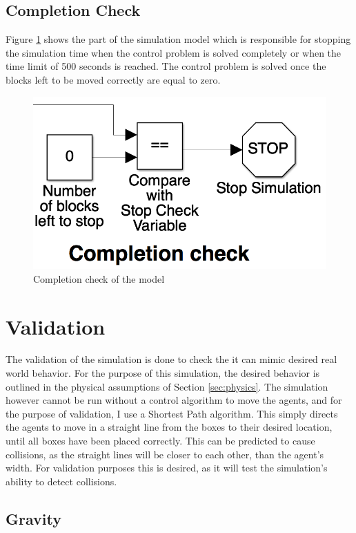 \subsection{Completion Check}
Figure \ref{fig:completion_check} shows the part of the simulation model which is responsible for stopping the simulation time when the control problem is solved completely or when the time limit of 500 seconds is reached. The control problem is solved once the blocks left to be moved correctly are equal to zero. 

\begin{figure}[H]
  \centering
  \includegraphics[width=.6\columnwidth]{figures/completion_check}
  \caption{\label{fig:completion_check}Completion check of the model}
\end{figure}

\section{Validation}
\label{sec:validation}

The validation of the simulation is done to check the it can mimic desired real world behavior. For the purpose of this simulation, the desired behavior is outlined in the physical assumptions of Section \ref{sec:physics}. The simulation however cannot be run without a control algorithm to move the agents, and for the purpose of validation, I use a Shortest Path algorithm. This simply directs the agents to move in a straight line from the boxes to their desired location, until all boxes have been placed correctly. This can be predicted to cause collisions, as the straight lines will be closer to each other, than the agent's width. For validation purposes this is desired, as it will test the simulation's ability to detect collisions. 


\subsection{Gravity}

